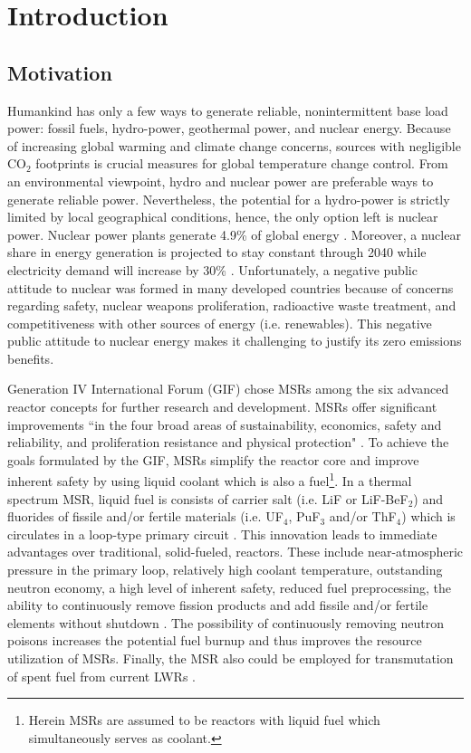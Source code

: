 \chapter[Introduction]{Introduction}

\section{Motivation}

Humankind has only a few ways to generate reliable, nonintermittent 
base load power: fossil fuels, hydro-power, geothermal power, and 
nuclear energy. Because of increasing global warming and climate 
change concerns, sources with negligible CO$_2$ footprints 
is crucial measures for global temperature change control. 
From an environmental viewpoint, hydro and nuclear power are 
preferable ways to generate reliable power. Nevertheless, the 
potential for a hydro-power is strictly limited by local geographical 
conditions, hence, the only option left is nuclear power. Nuclear 
power plants generate 4.9\% of global energy \cite{noauthor_key_2017}. 
Moreover, a nuclear share in energy generation is projected to stay 
constant through 2040 while electricity demand will 
increase by 30\% \cite{noauthor_world_2017}. Unfortunately, a negative 
public attitude to nuclear was formed in many developed countries 
because of concerns regarding safety, nuclear weapons 
proliferation, radioactive waste treatment, and competitiveness with 
other sources of energy (i.e. renewables). This negative public 
attitude to nuclear energy makes it challenging to justify its zero 
emissions benefits.

Generation IV International Forum (GIF) chose \glspl{MSR} among the 
six advanced reactor concepts for further research and development. 
\glspl{MSR} 
offer significant improvements ``in the four broad areas of 
sustainability, economics, safety and reliability, and proliferation 
resistance and physical protection" \cite{doe_technology_2002}. To 
achieve the goals formulated by the GIF, \glspl{MSR} 
simplify the reactor core and improve inherent safety by using 
liquid coolant which is also a fuel\footnote{Herein \glspl{MSR} are 
assumed to be reactors with liquid fuel which simultaneously serves 
as coolant.}. In a thermal spectrum \gls{MSR}, liquid fuel is consists 
of carrier salt (i.e. LiF or LiF-BeF$_2$) and fluorides of fissile 
and/or fertile materials (i.e. UF$_4$, PuF$_3$ and/or ThF$_4$) 
which is circulates in a loop-type primary circuit 
\cite{haubenreich_experience_1970}. 
This innovation leads to immediate advantages over traditional, 
solid-fueled, reactors. These include near-atmospheric pressure 
in the primary loop, relatively high coolant temperature, outstanding 
neutron economy, a high level of inherent safety, reduced fuel 
preprocessing, the ability to continuously remove fission products 
and add fissile and/or fertile elements without shutdown 
\cite{leblanc_molten_2010}. The possibility of continuously removing 
neutron poisons increases the potential fuel burnup and thus 
improves the resource utilization of \glspl{MSR}. Finally, the \gls{MSR} 
also could be employed for transmutation of 
spent fuel from current \glspl{LWR} \cite{fratoni_design_2004}.

